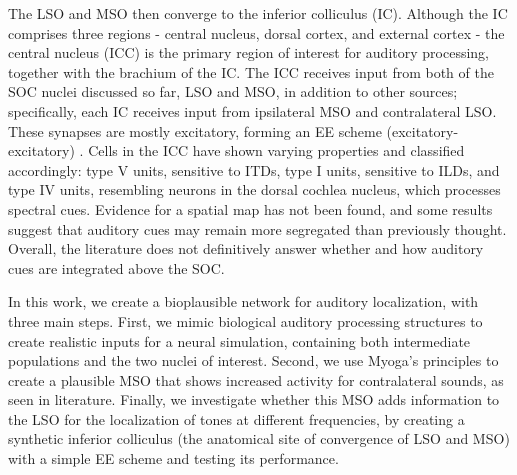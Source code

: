 \documentclass[11pt,a4paper,twocolumn]{article}
\newcommand{\parspace}{\vspace{7pt}}
\begin{document}
\parspace

The LSO and MSO then converge to the inferior colliculus (IC). Although the IC comprises three regions - central nucleus, dorsal cortex, and external cortex - the central nucleus (ICC) is the primary region of interest for auditory processing, together with the brachium of the IC. The ICC receives input from both of the SOC nuclei discussed so far, LSO and MSO, in addition to other sources; specifically, each IC receives input from ipsilateral MSO and contralateral LSO. These synapses are mostly excitatory, forming an EE scheme (excitatory-excitatory) \cite{grotheMechanismsSoundLocalization2010}. Cells in the ICC have shown varying properties and classified accordingly: type V units, sensitive to ITDs, type I units, sensitive to ILDs, and type IV units, resembling neurons in the dorsal cochlea nucleus, which processes spectral cues. Evidence for a spatial map has not been found, and some results \cite{sleeAlignmentSoundLocalization2014} suggest that auditory cues may remain more segregated than previously thought. Overall, the literature does not definitively answer whether and how auditory cues are integrated above the SOC.

\parspace
In this work, we create a bioplausible network for auditory localization, with three main steps. First, we mimic biological auditory processing structures to create realistic inputs for a neural simulation, containing both intermediate populations and the two nuclei of interest. Second, we use Myoga's principles to create a plausible MSO that shows increased activity for contralateral sounds, as seen in literature. Finally, we investigate whether this MSO adds information to the LSO for the localization of tones at different frequencies, by creating a synthetic inferior colliculus (the anatomical site of convergence of LSO and MSO) with a simple EE scheme and testing its performance.
\end{document}
